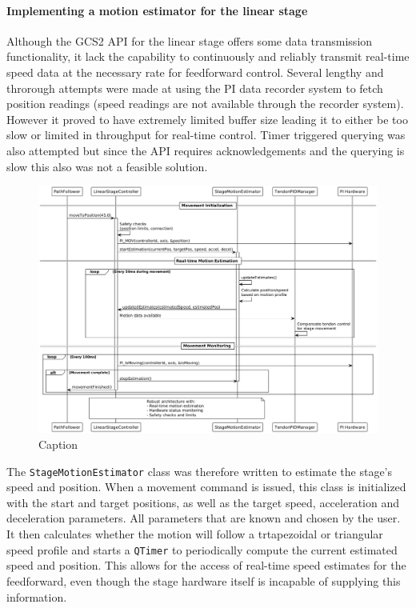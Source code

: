 \paragraph*{Implementing a motion estimator for the linear stage}
Although the GCS2 API for the linear stage offers some data transmission functionality, it lack the capability to continuously and reliably transmit real-time speed data at the necessary rate for feedforward control. Several lengthy and throrough attempts were made at using the PI data recorder system to fetch position readings (speed readings are not available through the recorder system). However it proved to have extremely limited buffer size leading it to either be too slow or limited in throughput for real-time control. Timer triggered querying was also attempted but since the API requires acknowledgements and the querying is slow this also was not a feasible solution.

\begin{figure}
    \centering
    \includegraphics[width=\linewidth]{images/linearstage/movetopos_sequencediag.png}
    \caption{Caption}
    \label{fig:enter-label}
\end{figure}

The \texttt{StageMotionEstimator} class was therefore written to estimate the stage's speed and position. When a movement command is issued, this class is initialized with the start and target positions, as well as the target speed, acceleration and deceleration parameters. All parameters that are known and chosen by the user. It then calculates whether the motion will follow a trtapezoidal or triangular speed profile and starts a \texttt{QTimer} to periodically compute the current estimated speed and position. This allows for the access of real-time speed estimates for the feedforward, even though the stage hardware itself is incapable of supplying this information.


